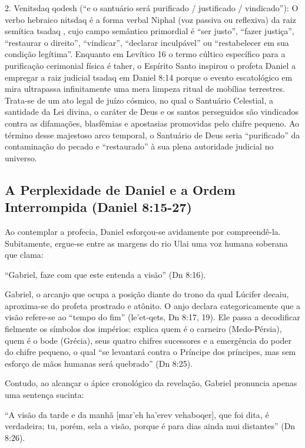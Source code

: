 \documentclass[11pt,a4paper,openany]{book}
\begin{document}
2. Venitsdaq qodesh (``e o santuário será purificado / justificado / vindicado''): O verbo hebraico nitsdaq é a forma verbal Niphal (voz passiva ou reflexiva) da raiz semítica tsadaq , cujo campo semântico primordial é ``ser justo'', ``fazer justiça'', ``restaurar o direito'', ``vindicar'', ``declarar inculpável'' ou ``restabelecer em sua condição legítima''. Enquanto em Levítico 16 o termo cúltico específico para a purificação cerimonial física é taher, o Espírito Santo inspirou o profeta Daniel a empregar a raiz judicial tsadaq em Daniel 8:14 porque o evento escatológico em mira ultrapassa infinitamente uma mera limpeza ritual de mobílias terrestres. Trata-se de um ato legal de juízo cósmico, no qual o Santuário Celestial, a santidade da Lei divina, o caráter de Deus e os santos perseguidos são vindicados contra as difamações, blasfêmias e apostasias promovidas pelo chifre pequeno. Ao término desse majestoso arco temporal, o Santuário de Deus seria ``purificado'' da contaminação do pecado e ``restaurado'' à sua plena autoridade judicial no universo.



\subsection{A Perplexidade de Daniel e a Ordem Interrompida (Daniel 8:15-27)}


Ao contemplar a profecia, Daniel esforçou-se avidamente por compreendê-la. Subitamente, ergue-se entre as margens do rio Ulai uma voz humana soberana que clama:

``Gabriel, faze com que este entenda a visão'' (Dn 8:16).

Gabriel, o arcanjo que ocupa a posição diante do trono da qual Lúcifer decaiu, aproxima-se do profeta prostrado e atônito. O anjo declara categoricamente que a visão refere-se ao ``tempo do fim'' (le'et-qets, Dn 8:17, 19). Ele passa a decodificar fielmente os símbolos dos impérios: explica quem é o carneiro (Medo-Pérsia), quem é o bode (Grécia), seus quatro chifres sucessores e a emergência do poder do chifre pequeno, o qual ``se levantará contra o Príncipe dos príncipes, mas sem esforço de mãos humanas será quebrado'' (Dn 8:25).

Contudo, ao alcançar o ápice cronológico da revelação, Gabriel pronuncia apenas uma sentença sucinta:

``A visão da tarde e da manhã [mar'eh ha'erev vehaboqer], que foi dita, é verdadeira; tu, porém, sela a visão, porque é para dias ainda mui distantes'' (Dn 8:26).
\end{document}
